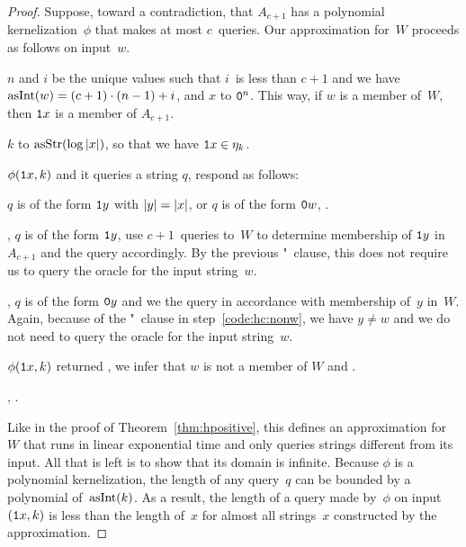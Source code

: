 \begin{proof}
  Suppose, toward a contradiction, that $A_{c + 1}$ has a polynomial kernelization~$\phi$ that makes at most $c$~queries.
  Our approximation for~$W$ proceeds as follows on input~$w$.
  \begin{codelisting}
  \item
     $n$ and $i$ be the unique values such that $i$~is less than $c + 1$ and we have $\asNat(w) = (c + 1) \cdot (n - 1) + i$, and  $x$ to $\bits{0}^n$.
    This way, if $w$ is a member of~$W$, then $\bits{1}x$ is a member of $A_{c + 1}$.
  \item
     $k$ to $\asStr(\log \length{x})$, so that we have $\bits{1}x \in \eta_k$.
  \item
     $\phi(\bits{1}x, k)$ and  it queries a string $q$, respond as follows:
    \begin{codelisting}
    \item\label{code:hc:nonw}%
       $q$ is of the form $\bits{1}y$ with $\length{y} = \length{x}$, or  $q$ is of the form $\bits{0}w$,  .
    \item
      ,  $q$ is of the form $\bits{1}y$, use $c + 1$~queries to~$W$ to determine membership of $\bits{1}y$ in~$A_{c + 1}$ and  the query accordingly.
      By the previous "~clause, this does not require us to query the oracle for the input string~$w$.
    \item
      , $q$ is of the form $\bits{0}y$ and we  the query in accordance with membership of~$y$ in~$W$.
      Again, because of the "~clause in step~\ref{code:hc:nonw}, we have $y \neq w$ and we do not need to query the oracle for the input string~$w$.
    \end{codelisting}
  \item
     $\phi(\textnormal{\texttt{1}}x, k)$ returned , we infer that $w$ is not a member of $W$ and  .
  \item
    ,  .
  \end{codelisting}
  Like in the proof of Theorem~\ref{thm:hpositive}, this defines an approximation for~$W$ that runs in linear exponential time and only queries strings different from its input.
  All that is left is to show that its domain is infinite.
  Because $\phi$ is a polynomial kernelization, the length of any query~$q$ can be bounded by a polynomial of~$\operatorname{asInt}(k)$.
  As a result, the length of a query made by~$\phi$ on input~$(\textnormal{\texttt{1}}x, k)$ is less than the length of~$x$ for almost all strings~$x$ constructed by the approximation.

\end{proof}
